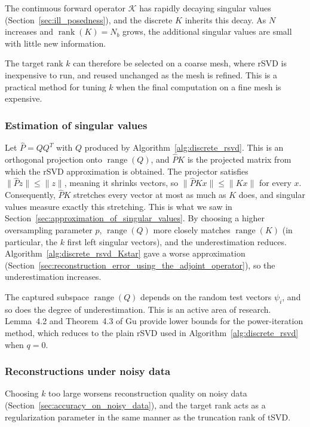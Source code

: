 The continuous forward operator $\mathcal{K}$ has rapidly decaying singular values (Section~\ref{sec:ill_posedness}), and the discrete $K$ inherits this decay. As $N$ increases and $\operatorname{rank}(K) = N_b$ grows, the additional singular values are small with little new information.

The target rank $k$ can therefore be selected on a coarse mesh, where rSVD is inexpensive to run, and reused unchanged as the mesh is refined. This is a practical method for tuning $k$ when the final computation on a fine mesh is expensive.


\subsubsection{Estimation of singular values}
Let $\hat P = QQ^T$ with $Q$ produced by Algorithm~\ref{alg:discrete_rsvd}. This is an orthogonal projection onto $\operatorname{range}(Q)$, and $\hat P K$ is the projected matrix from which the rSVD approximation is obtained. The projector satisfies $\| \hat P z \| \le \| z \|$, meaning it shrinks vectors, so $\| \hat P K x  \| \le \|K x \|$ for every $x$. Consequently, $\hat P K$ stretches every vector at most as much as $K$ does, and singular values measure exactly this stretching. This is what we saw in Section~\ref{sec:approximation_of_singular_values}. By choosing a higher oversampling parameter $p$, $\operatorname{range}(Q)$ more closely matches $\operatorname{range}(K)$ (in particular, the $k$ first left singular vectors), and the underestimation reduces. Algorithm~\ref{alg:discrete_rsvd_Kstar} gave a worse approximation (Section~\ref{sec:reconstruction_error_using_the_adjoint_operator}), so the underestimation increases.

The captured subspace $\operatorname{range}(Q)$ depends on the random test vectors $\psi_i$, and so does the degree of underestimation. This is an active area of research. Lemma~4.2 and Theorem~4.3 of Gu \cite{guSubspaceIterationRandomization2015} provide lower bounds for the power-iteration method, which reduces to the plain rSVD used in Algorithm~\ref{alg:discrete_rsvd} when $q = 0$.


\subsubsection{Reconstructions under noisy data}
Choosing $k$ too large worsens reconstruction quality on noisy data (Section~\ref{sec:accuracy_on_noisy_data}), and the target rank acts as a regularization parameter in the same manner as the truncation rank of tSVD.

